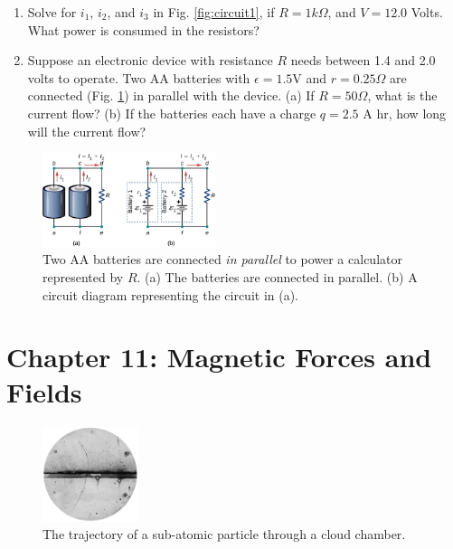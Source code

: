 \documentclass[10pt]{article}
\begin{document}
\begin{enumerate}
\item Solve for $i_1$, $i_2$, and $i_3$ in Fig. \ref{fig:circuit1}, if $R=1 k\Omega$, and $V = 12.0$ Volts. What power is consumed in the resistors? \\ \vspace{4cm}
\item Suppose an electronic device with resistance $R$ needs between 1.4 and 2.0 volts to operate.  Two AA batteries with $\epsilon = 1.5$V and $r = 0.25\Omega$ are connected (Fig. \ref{fig:ohm2}) in parallel with the device.  (a) If $R = 50\Omega$, what is the current flow? (b) If the batteries each have a charge $q = 2.5$ A hr, how long will the current flow? \\ \vspace{3cm}
\end{enumerate}

\begin{figure}[hb]
\centering
\includegraphics[width=0.45\textwidth]{battery2.jpeg}
\caption{\label{fig:ohm2} Two AA batteries are connected \textit{in parallel} to power a calculator represented by $R$.  (a) The batteries are connected in parallel.  (b) A circuit diagram representing the circuit in (a).}
\end{figure}

\section{Chapter 11: Magnetic Forces and Fields}

\begin{figure}[ht]
\centering
\includegraphics[width=0.25\textwidth]{PositronDiscovery.jpg}
\caption{\label{fig:pipe1} The trajectory of a sub-atomic particle through a cloud chamber.}
\end{figure}
\end{document}
